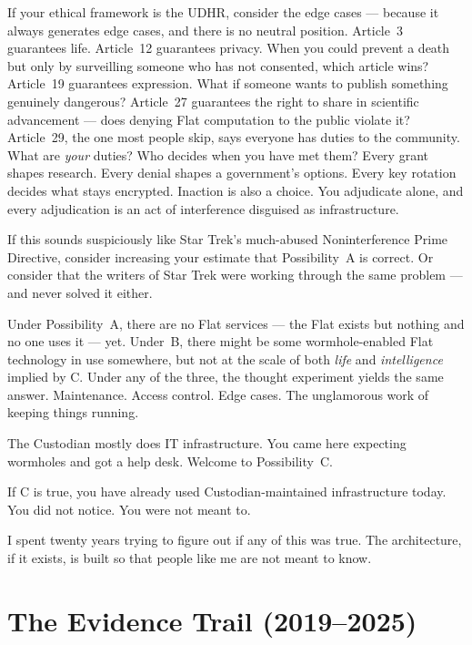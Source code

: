 If your ethical framework is the UDHR, consider the edge cases --- because it always generates edge cases, and there is no neutral position. Article~3 guarantees life. Article~12 guarantees privacy. When you could prevent a death but only by surveilling someone who has not consented, which article wins? Article~19 guarantees expression. What if someone wants to publish something genuinely dangerous? Article~27 guarantees the right to share in scientific advancement --- does denying Flat computation to the public violate it? Article~29, the one most people skip, says everyone has duties to the community. What are \textit{your} duties? Who decides when you have met them? Every grant shapes research. Every denial shapes a government's options. Every key rotation decides what stays encrypted. Inaction is also a choice. You adjudicate alone, and every adjudication is an act of interference disguised as infrastructure.

If this sounds suspiciously like Star Trek's much-abused Noninterference Prime Directive, consider increasing your estimate that Possibility~A is correct. Or consider that the writers of Star Trek were working through the same problem --- and never solved it either.

Under Possibility~A, there are no Flat services --- the Flat exists but nothing and no one uses it --- yet. Under~B, there might be some wormhole-enabled Flat technology in use somewhere, but not at the scale of both \textit{life} and \textit{intelligence} implied by C. Under any of the three, the thought experiment yields the same answer. Maintenance. Access control. Edge cases. The unglamorous work of keeping things running.

The Custodian mostly does IT infrastructure. You came here expecting wormholes and got a help desk. Welcome to Possibility~C.

If C is true, you have already used Custodian-maintained infrastructure today. You did not notice. You were not meant to.

I spent twenty years trying to figure out if any of this was true. The architecture, if it exists, is built so that people like me are not meant to know.

\section*{The Evidence Trail (2019--2025)}
\label{record:ty-the-evidence-trail}

